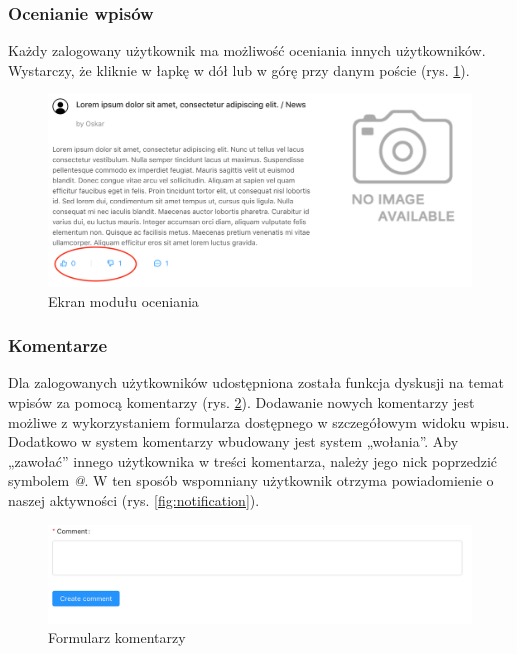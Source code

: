 \documentclass[declaration,shortabstract]{iithesis}
\begin{document}
\subsubsection{Ocenianie wpisów}
Każdy zalogowany użytkownik ma możliwość oceniania innych użytkowników. Wystarczy, że kliknie w łapkę w dół lub w górę przy danym poście (rys. \ref{fig:like}).
\begin{figure}
    \centering
    \includegraphics[width=\linewidth]{images/like.png}
    \caption{Ekran modułu oceniania}
    \label{fig:like}
\end{figure}

\subsubsection{Komentarze}
Dla zalogowanych użytkowników udostępniona została funkcja dyskusji na temat wpisów za pomocą komentarzy (rys. \ref{fig:comment}). Dodawanie nowych komentarzy jest możliwe z wykorzystaniem formularza dostępnego w szczegółowym widoku wpisu. Dodatkowo w system komentarzy wbudowany jest system „wołania”. Aby „zawołać” innego użytkownika w treści komentarza, należy jego nick poprzedzić symbolem \textit{@}. W ten sposób wspomniany użytkownik otrzyma powiadomienie o naszej aktywności (rys. \ref{fig:notification}).

\begin{figure}
    \centering
    \includegraphics[width=\linewidth]{images/komentarz.png}
    \caption{Formularz komentarzy}
    \label{fig:comment}
\end{figure}
\end{document}
